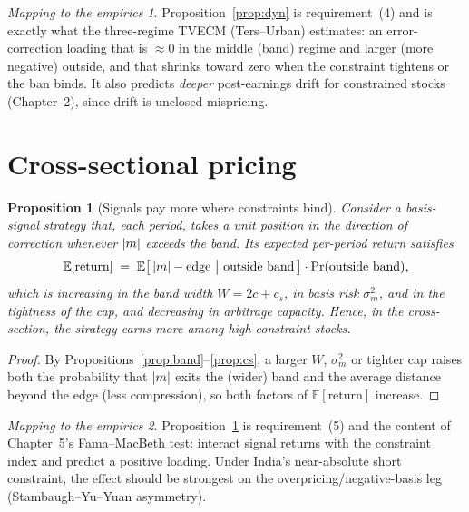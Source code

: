 \documentclass[11pt,a4paper]{article}
\newcommand{\E}{\mathbb{E}}\newcommand{\Var}{\operatorname{Var}}
\DeclarePairedDelimiter{\abs}{\lvert}{\rvert}
\theoremstyle{plain}
\newtheorem{proposition}{Proposition}
\theoremstyle{definition}
\theoremstyle{remark}
\newtheorem*{takeaway}{Mapping to the empirics}
\begin{document}
\begin{takeaway}
Proposition~\ref{prop:dyn} is requirement~(4) and is exactly what the three-regime TVECM (Ters--Urban) estimates: an error-correction loading that is $\approx 0$ in the middle (band) regime and larger (more negative) outside, and that shrinks toward zero when the constraint tightens or the ban binds. It also predicts \emph{deeper} post-earnings drift for constrained stocks (Chapter~2), since drift is unclosed mispricing.
\end{takeaway}

\section{Cross-sectional pricing}\label{sec:xs}
\begin{proposition}[Signals pay more where constraints bind]\label{prop:xs}
Consider a basis-signal strategy that, each period, takes a unit position in the direction of correction whenever $\abs{m}$ exceeds the band. Its expected per-period return satisfies
\begin{equation}
\E[\text{return}] \;=\; \E\big[\,\abs{m}-\text{edge}\ \big|\ \text{outside band}\,\big]\cdot\Pr(\text{outside band}),
\end{equation}
which is increasing in the band width $W=2c+c_s$, in basis risk $\sigma_m^2$, and in the tightness of the cap, and decreasing in arbitrage capacity. Hence, in the cross-section, the strategy earns more among high-constraint stocks.
\end{proposition}
\begin{proof}
By Propositions~\ref{prop:band}--\ref{prop:cs}, a larger $W$, $\sigma_m^2$ or tighter cap raises both the probability that $\abs{m}$ exits the (wider) band and the average distance beyond the edge (less compression), so both factors of $\E[\text{return}]$ increase.
\end{proof}

\begin{takeaway}
Proposition~\ref{prop:xs} is requirement~(5) and the content of Chapter~5's Fama--MacBeth test: interact signal returns with the constraint index and predict a positive loading. Under India's near-absolute short constraint, the effect should be strongest on the overpricing/negative-basis leg (Stambaugh--Yu--Yuan asymmetry).
\end{takeaway}
\end{document}
